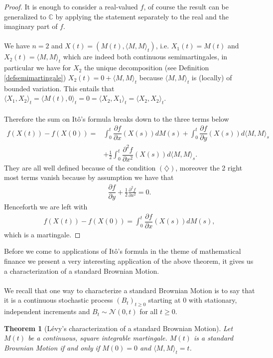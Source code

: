 \documentclass[11pt,a4paper, final]{article}
\newtheorem{thm}{Theorem}[section]
\begin{document}
\begin{proof} It is enough to consider a real-valued $f$, of course the result can be generalized to $\mathbb{C}$ by applying the statement separately to the real and the imaginary part of $f$. 
\\\\
We have $n=2$ and $X(t)=(M(t), \langle M, M \rangle_t)$, i.e. $X_1(t)=  M(t)$ and $X_2(t)= \langle M, M \rangle_t$ which are indeed both continuous semimartingales, in particular we have for $X_2$ the unique decomposition (see Definition \ref{defsemimartingale}) $X_2(t)=0 + \langle M, M \rangle_t$ because $\langle M, M \rangle_t$ is (locally) of bounded variation. This entails that $\langle X_1, X_2 \rangle_t = \langle M(t), 0 \rangle_t=0= \langle X_2, X_1 \rangle_t = \langle X_2, X_2 \rangle_t$.  
\\\\
Therefore the sum on Itô's formula breaks down to the three terms below
\begin{align*}
f(X(t))-f(X(0)) = &\int_0^t \dfrac{\partial f}{\partial x}(X(s))dM(s) + \int_0^t \dfrac{\partial f}{\partial y}(X(s)) d \langle M, M \rangle_s  \\
& +\frac{1}{2} \int_0^t \dfrac{\partial^2f}{\partial x^2}(X(s)) d \langle M, M \rangle_s.
\end{align*}
They are all well defined because of the condition $(\diamondsuit)$, moreover the 2 right most terms vanish because by assumption we have that 
\begin{align*}
\dfrac{\partial f}{\partial y}+ \frac{1}{2} \frac{\partial^2 f}{\partial x^2} =0.
\end{align*}
Henceforth we are left with
\begin{align*}
f(X(t))-f(X(0)) = \int_0^t \dfrac{\partial f}{\partial x} (X(s)) dM(s),
\end{align*}
which is a martingale. 
\end{proof}
\noindent Before we come to applications of Itô's formula in the theme of mathematical finance we present a very interesting application of the above theorem, it gives us a characterization of a standard Brownian Motion. 
\\\\
We recall that one way to characterize a standard Brownian Motion is to say that it is a continuous stochastic process $(B_t)_{t \geq 0}$ starting at $0$ with stationary, independent increments and $B_t \sim \mathcal{N}(0,t)$ for all $t \geq 0$. 
\newpage
\begin{thm}[Lévy's characterization of a standard Brownian Motion] Let $M(t)$ be a continuous, square integrable martingale. $M(t)$ is a standard Brownian Motion if and only if $M(0)=0$ and $\langle M,M \rangle_t = t$.
\end{thm}
\end{document}
